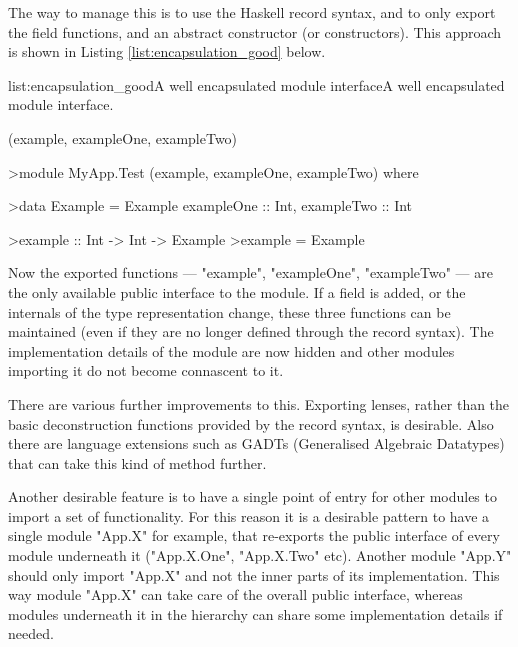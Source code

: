 The way to manage this is to use the Haskell record syntax, and to only export the field functions, and an abstract constructor (or constructors). This approach is shown in Listing \ref{list:encapsulation_good} below.

\vspace{-0.5em}
\begin{listing}{list:encapsulation_good}{A well encapsulated module interface}{A well encapsulated module interface.}{}
\end{listing}\vspace{-1.5em}

\functions(example, exampleOne, exampleTwo)
\begin{haskell}
>module MyApp.Test (example, exampleOne, exampleTwo) where

>data Example = Example { exampleOne :: Int, exampleTwo :: Int }

>example :: Int -> Int -> Example
>example = Example

\end{haskell}
\noindent
Now the exported functions --- "example", "exampleOne", "exampleTwo" --- are the only available public interface to the module. If a field is added, or the internals of the type representation change, these three functions can be maintained (even if they are no longer defined through the record syntax). The implementation details of the module are now hidden and other modules importing it do not become connascent to it.

There are various further improvements to this. Exporting lenses, rather than the basic deconstruction functions provided by the record syntax, is desirable. Also there are language extensions such as GADTs (Generalised Algebraic Datatypes) that can take this kind of method further.

Another desirable feature is to have a single point of entry for other modules to import a set of functionality. For this reason it is a desirable pattern to have a single module "App.X" for example, that re-exports the public interface of every module underneath it ("App.X.One", "App.X.Two" etc). Another module "App.Y" should only import "App.X" and not the inner parts of its implementation. This way module "App.X" can take care of the overall public interface, whereas modules underneath it in the hierarchy can share some implementation details if needed.

